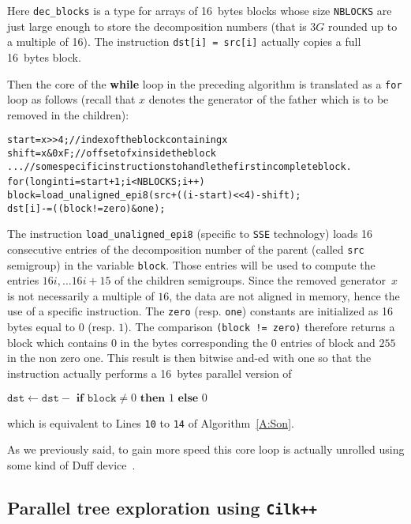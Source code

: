 \documentclass[reqno]{amsart}
\theoremstyle{plain}
\theoremstyle{definition}
\newcommand{\CilkP}{\texttt{Cilk++}\xspace}
\newcommand{\SSE}{\texttt{SSE}\xspace}
\renewcommand{\tt}[1]{\texttt{#1}}
\begin{document}
Here \tt{dec\_blocks} is a type for arrays of 16~bytes blocks whose size
\tt{NBLOCKS} are just large enough to store the decomposition numbers (that is
$3G$ rounded up to a multiple of 16). The instruction \tt{dst[i] = src[i]}
actually copies a full 16~bytes block.

Then the core of the \textbf{while} loop in the preceding algorithm is
translated as a \texttt{for} loop as follows (recall that $x$ denotes the generator of
the father which is to be removed in the children):

{\small
\begin{alltt}
start = x >> 4;      // index of the block containing x
shift = x & 0xF;     // offset of x inside the block
...                  // some specific instructions to handle the first incomplete block.
for (long int i=start+1; i<NBLOCKS; i++) {
  block = load_unaligned_epi8(src + ((i-start)<<4) - shift);
  dst[i] -= ((block != zero) & one);
}
\end{alltt}
}

The instruction \tt{load\_unaligned\_epi8} (specific to \SSE technology) loads
 16 consecutive entries of the decomposition number
of the parent (called \tt{src} semigroup) in the variable \tt{block}.
Those entries will be used to compute
the entries $16i, \dots 16i+15$ of the children semigroups. Since the removed
generator~$x$ is not necessarily a multiple of $16$, the data are not aligned
in memory, hence the use of a specific instruction. The \tt{zero}
(resp. \tt{one}) constants are initialized as 16 bytes equal to $0$
(resp. $1$). The comparison \tt{(block != zero)} therefore returns a block
which contains $0$ in the bytes corresponding the $0$ entries of block and
$255$ in the non zero one. This result is then bitwise and-ed with one so that
the instruction actually performs a 16~bytes parallel version of


\begin{center}
$\tt{dst} \gets \tt{dst} - \textbf{ if } \tt{block} \neq 0 \textbf{ then } 1 \textbf{ else } 0$
\end{center}

\noindent which is equivalent to Lines \tt{10} to \tt{14} of Algorithm~\ref{A:Son}.
\medskip

As we previously said, to gain more speed this core loop is actually unrolled
using some kind of Duff device~\cite{WikipediaDuff}. 

\subsection{Parallel tree exploration using \CilkP}
\end{document}
